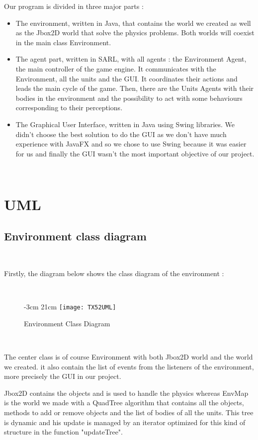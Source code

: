 \documentclass[a4paper,10pt]{book}
\begin{document}
Our program is divided in three major parts :
\begin{itemize}
 \item The environment, written in Java, that contains the world we created as well as the Jbox2D world that solve the physics
 problems. Both worlds will coexist in the main class Environment.
 \item The agent part, written in SARL, with all agents : the Environment Agent, the main controller of the game engine. It
 communicates with the Environment, all the units and the GUI. It coordinates their actions and leads the main cycle of the game.
 Then, there are the Units Agents with their bodies in the environment and the possibility to act with some behaviours corresponding to
 their perceptions.
 \item The Graphical User Interface, written in Java using Swing libraries. We didn't choose the best solution to do the GUI as
 we don't have much experience with JavaFX and so we chose to use Swing because it was easier for us and finally the GUI wasn't the most
 important objective of our project.
\end{itemize}

~
\newpage
\section {UML}
\subsection{Environment class diagram}
~

Firstly, the diagram below shows the class diagram of the environment :

~

\begin{figure}[!ht]
  -3cm 21cm
 \centering
 \texttt{[image: TX52UML]}
 \caption{Environment Class Diagram}
\end{figure}

~

The center class is of course Environment with both Jbox2D world and the world we created. it also contain the list of events from the listeners of the environment, more precisely the GUI in our project.

Jbox2D contains the objects and is used to handle the physics whereas EnvMap is the world we made with a QuadTree algorithm that contains all the objects, methods to add or remove objects and the list of bodies of all the units. This tree is dynamic and his update is managed by an iterator optimized for this kind of structure in the function "updateTree".
\end{document}
